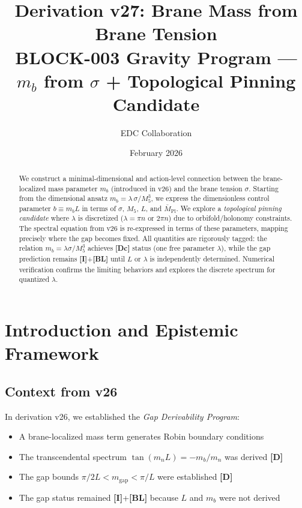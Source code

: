 \documentclass[11pt,a4paper]{article}
\newcommand{\Mpl}{\bar{M}_{\mathrm{Pl}}}
\newcommand{\Mfive}{M_5}
\newcommand{\mgap}{m_{\mathrm{gap}}}
\newcommand{\mb}{m_b}
\newcommand{\tagD}{\textbf{[D]}}
\newcommand{\tagDc}{\textbf{[Dc]}}
\newcommand{\tagI}{\textbf{[I]}}
\newcommand{\tagBL}{\textbf{[BL]}}
\theoremstyle{definition}
\theoremstyle{plain}
\theoremstyle{remark}
\begin{document}
\title{\textbf{Derivation v27: Brane Mass from Brane Tension}\\[0.5em]
\large BLOCK-003 Gravity Program --- $\mb$ from $\sigma$ + Topological Pinning Candidate}
\author{EDC Collaboration}
\date{February 2026}
\maketitle

\begin{abstract}
We construct a minimal-dimensional and action-level connection between the brane-localized
mass parameter $\mb$ (introduced in v26) and the brane tension $\sigma$. Starting from
the dimensional ansatz $\mb = \lambda\,\sigma/\Mfive^3$, we express the dimensionless
control parameter $b \equiv \mb L$ in terms of $\sigma$, $\Mfive$, $L$, and $\Mpl$.
We explore a \emph{topological pinning candidate} where $\lambda$ is discretized
($\lambda = \pi n$ or $2\pi n$) due to orbifold/holonomy constraints. The spectral
equation from v26 is re-expressed in terms of these parameters, mapping precisely
where the gap becomes fixed. All quantities are rigorously tagged: the relation
$\mb = \lambda\sigma/\Mfive^3$ achieves \tagDc{} status (one free parameter $\lambda$),
while the gap prediction remains \tagI{}+\tagBL{} until $L$ or $\lambda$ is independently
determined. Numerical verification confirms the limiting behaviors and explores
the discrete spectrum for quantized $\lambda$.
\end{abstract}

\tableofcontents
\newpage

\section{Introduction and Epistemic Framework}
\label{sec:intro}

\subsection{Context from v26}

In derivation v26, we established the \emph{Gap Derivability Program}:
\begin{itemize}
\item A brane-localized mass term generates Robin boundary conditions
\item The transcendental spectrum $\tan(m_n L) = -\mb/m_n$ was derived \tagD{}
\item The gap bounds $\pi/2L < \mgap < \pi/L$ were established \tagD{}
\item The gap status remained \tagI{}+\tagBL{} because $L$ and $\mb$ were not derived
\end{itemize}
\end{document}

